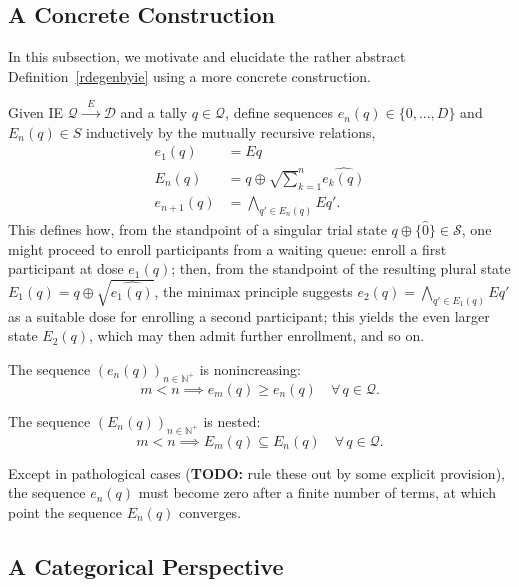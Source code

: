 \documentclass{article}
\newcommand{\N}{\mathbb{N}}
\renewcommand{\S}{\ensuremath{\mathcal{S}}} %
\newcommand{\D}{\ensuremath{\mathcal{D}}}
\newcommand{\Q}{\ensuremath{\mathcal{Q}}}
\begin{document}
\subsection{A Concrete Construction}

In this subsection, we motivate and elucidate the rather abstract Definition~\ref{rdegenbyie} using a more concrete construction.

\begin{nota}\label{mutrec}
  Given IE $\Q \xrightarrow{\;\;E\;\;} \D$ and a tally $q \in \Q$, define sequences $e_n(q) \in \{0,...,D\}$ and $E_n(q) \in S$ inductively by the mutually recursive relations,
  $$
  \begin{aligned}
    e_1(q) &= E q \\
    E_n(q) &= q \oplus \surd \sum_{k=1}^n \widehat{e_k(q)} \\
    e_{n+1}(q) &= \bigwedge_{q' \in E_n(q)} E q'.
  \end{aligned}
  $$
This defines how, from the standpoint of a singular trial state $q \oplus \{\widehat{0}\} \in \S$, one might proceed to enroll participants from a waiting queue: enroll a first participant at dose $e_1(q)$; then, from the standpoint of the resulting plural state $E_1(q) = q \oplus \surd\widehat{e_1(q)}$, the minimax principle suggests $e_2(q) = \bigwedge_{q' \in E_1(q)} E q'$ as a suitable dose for enrolling a second participant; this yields the even larger state $E_2(q)$, which may then admit further enrollment, and so on.
\end{nota}

\begin{fact}
  The sequence $(e_n(q))_{n \in \N^+}$ is nonincreasing:
  $$
  m < n \implies e_m(q) \ge e_n(q) \quad \forall\, q \in \Q.
  $$
\end{fact}

\begin{fact}
  The sequence $(E_n(q))_{n \in \N^+}$ is nested:
  $$
  m < n \implies E_m(q) \subseteq E_n(q) \quad \forall\, q \in \Q.
  $$
\end{fact}

Except in pathological cases (\textbf{TODO:} rule these out by some explicit provision), the sequence $e_n(q)$ must become zero after a finite number of terms, at which point the sequence $E_n(q)$ converges.

\subsection{A Categorical Perspective}
\end{document}
